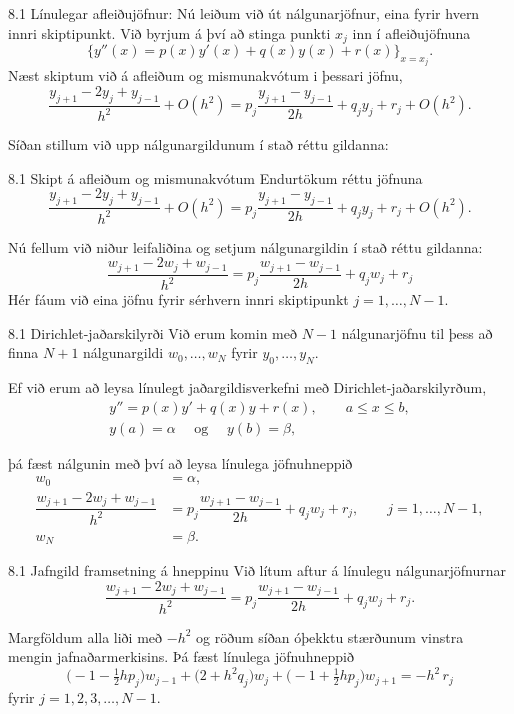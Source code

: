 \begin{frame}{8.1 Línulegar afleiðujöfnur:} 
Nú leiðum við út nálgunarjöfnur, eina fyrir hvern innri skiptipunkt.
Við byrjum á því að stinga punkti $x_j$ inn í afleiðujöfnuna
$$
\big\{ y''(x)= p(x)y'(x)+q(x)y(x) + r(x)\big\}_{x=x_j}.
$$
Næst skiptum við á afleiðum og mismunakvótum i þessari jöfnu,
$$
\dfrac{y_{j+1}-2y_j+y_{j-1}}{h^2} +O(h^2)
=p_j\dfrac{y_{j+1}-y_{j-1}}{2h}+q_jy_j+r_j+ O(h^2).
$$

\pause
Síðan  stillum við upp nálgunargildunum  í stað réttu gildanna:
\end{frame}

\begin{frame}{8.1 Skipt á afleiðum og mismunakvótum} 
Endurtökum réttu jöfnuna
$$
\dfrac{y_{j+1}-2y_j+y_{j-1}}{h^2} +O(h^2)
=p_j\dfrac{y_{j+1}-y_{j-1}}{2h}+q_jy_j+r_j+ O(h^2).
$$

\pause
Nú fellum við niður leifaliðina og 
setjum nálgunargildin í stað réttu gildanna:
$$
\dfrac{w_{j+1}-2w_j+w_{j-1}}{h^2}
=p_j\dfrac{w_{j+1}-w_{j-1}}{2h}+q_jw_j+r_j
$$
Hér fáum við eina jöfnu fyrir sérhvern innri skiptipunkt
$j=1,\dots,N-1$.
\end{frame}


\begin{frame}{8.1 Dirichlet-jaðarskilyrði} 
Við erum komin með $N-1$ 
nálgunarjöfnu til þess að finna $N+1$
nálgunargildi $w_0,\dots,w_N$ fyrir $y_0,\dots,y_N$. 

\smallskip
Ef við erum að leysa línulegt jaðargildisverkefni með 
Dirichlet-jaðarskilyrðum,
  \begin{gather*}
    y''=p(x)y'+q(x)y+r(x), \qquad a\leq x\leq b,\\
y(a)=\alpha \quad \text{ og } \quad y(b)=\beta,
  \end{gather*}

\pause
þá fæst nálgunin með því að leysa línulega jöfnuhneppið
\begin{align*}
w_0&=\alpha,\\
\dfrac{w_{j+1}-2w_j+w_{j-1}}{h^2}
&=p_j\dfrac{w_{j+1}-w_{j-1}}{2h}+q_jw_j+r_j, \qquad j=1,\dots,N-1,\\
w_N&=\beta.  
\end{align*}
\end{frame}


\begin{frame}{8.1 Jafngild framsetning á hneppinu} 
Við lítum aftur á línulegu nálgunarjöfnurnar
$$
\dfrac{w_{j+1}-2w_j+w_{j-1}}{h^2}
=p_j\dfrac{w_{j+1}-w_{j-1}}{2h}+q_jw_j+r_j.
$$

\pause
Margföldum alla liði með $-h^2$ og röðum síðan óþekktu stærðunum
vinstra mengin jafnaðarmerkisins. Þá fæst línulega jöfnuhneppið
$$
\big(-1-\tfrac 12 h p_j\big)w_{j-1}
+\big(2+h^2q_j\big) w_j
+\big(-1+\tfrac 12 h p_j\big)w_{j+1}
=-h^2\, r_j
$$
fyrir $j=1,2,3,\dots,N-1$.
\end{frame}



